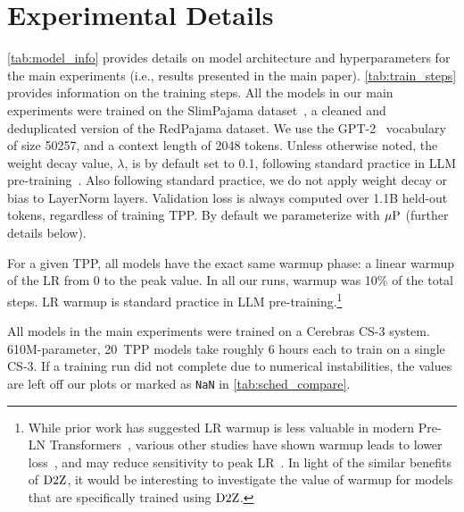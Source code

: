 \section{Experimental Details}\label{sec:experimental_details}





\cref{tab:model_info} provides details on model architecture and
hyperparameters for the main experiments (i.e., results presented in
the main paper).  \cref{tab:train_steps} provides information on
the training steps.  All the models in our main experiments were
trained on the SlimPajama dataset~\citep{cerebras2023slimpajama}, a
cleaned and deduplicated version of the RedPajama dataset.  We use the
GPT-2~\citep{radford2019gpt2} vocabulary of size 50257, and a context
length of 2048 tokens.
%
Unless otherwise noted, the weight decay value, $\lambda$, is by
default set to 0.1, following standard practice in LLM
pre-training~\citep{brown2020language,hoffmann2022empirical,almazrouei2023falcon,alephalpha2024introducing}.
%
Also following standard practice, we do not apply weight decay or bias
to LayerNorm layers.
%
Validation loss is always computed over 1.1B held-out tokens,
regardless of training TPP\@.
%
By default we parameterize with $\mbox{$\mu$P}$ (further details below).

For a given TPP, all models have the exact same warmup phase: a linear
warmup of the LR from 0 to the peak value.
%
In all our runs, warmup was 10\% of the total steps.
%
LR warmup is standard practice in LLM pre-training.\footnote{While
prior work has suggested LR warmup is less valuable in modern Pre-LN
Transformers~\citep{xiong2020layer}, various other studies have shown
warmup leads to lower
loss~\citep{goyal2017imagenet1hour,liu2019variance,tissue2024scaling,kosson2024analyzing},
and may reduce sensitivity to peak LR~\citep{wortsman2023small}.  In
light of the similar benefits of $\mbox{D2Z}$, it would be interesting to
investigate the value of warmup for models that are specifically
trained using $\mbox{D2Z}$.}

All models in the main experiments were trained on a Cerebras CS-3
system.  610M-parameter, 20~TPP models take roughly 6 hours each to
train on a single CS-3.
%
If a training run did not complete due to numerical instabilities, the
values are left off our plots or marked as \texttt{NaN} in
\cref{tab:sched_compare}.
%


